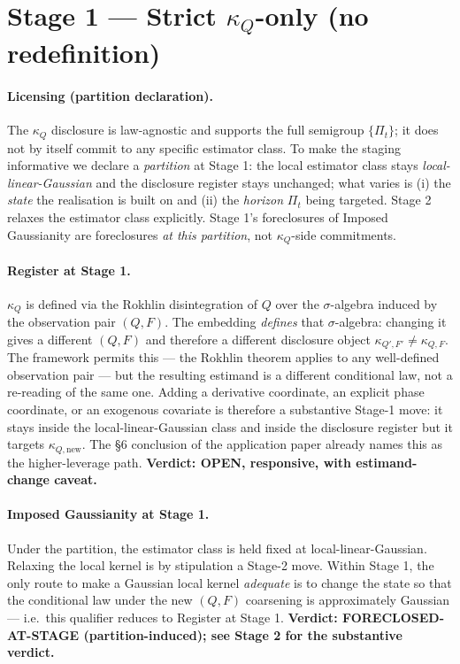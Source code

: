 \documentclass[11pt]{article}
\newcommand{\kQ}{\kappa_{Q}}
\begin{document}
\section{Stage 1 --- Strict \(\kQ\)-only (no redefinition)}
\label{sec:stage1}

\paragraph{Licensing (partition declaration).} The \(\kQ\)
disclosure is law-agnostic and supports the full semigroup
\(\{\Pi_t\}\); it does not by itself commit to any specific
estimator class. To make the staging informative we declare a
\emph{partition} at Stage 1: the local estimator class stays
\emph{local-linear-Gaussian} and the disclosure register stays
unchanged; what varies is (i) the \emph{state} the realisation is
built on and (ii) the \emph{horizon} \(\Pi_t\) being targeted.
Stage 2 relaxes the estimator class explicitly. Stage 1's
foreclosures of Imposed Gaussianity are foreclosures \emph{at this
partition}, not \(\kQ\)-side commitments.

\paragraph{Register at Stage 1.} \(\kQ\) is defined via the Rokhlin
disintegration of \(Q\) over the \(\sigma\)-algebra induced by the
observation pair \((Q, F)\). The embedding \emph{defines} that
\(\sigma\)-algebra: changing it gives a different \((Q, F)\) and
therefore a different disclosure object
\(\kappa_{Q', F'} \neq \kappa_{Q, F}\). The framework permits this ---
the Rokhlin theorem applies to any well-defined observation pair ---
but the resulting estimand is a different conditional law, not a
re-reading of the same one. Adding a derivative coordinate, an
explicit phase coordinate, or an exogenous covariate is therefore a
substantive Stage-1 move: it stays inside the local-linear-Gaussian
class and inside the disclosure register but it targets
\(\kappa_{Q,\mathrm{new}}\). The \S6 conclusion of the application
paper already names this as the higher-leverage path.
\textbf{Verdict: OPEN, responsive, with estimand-change caveat.}

\paragraph{Imposed Gaussianity at Stage 1.} Under the partition, the
estimator class is held fixed at local-linear-Gaussian. Relaxing the
local kernel is by stipulation a Stage-2 move. Within Stage 1, the
only route to make a Gaussian local kernel \emph{adequate} is to
change the state so that the conditional law under the new
\((Q, F)\) coarsening is approximately Gaussian --- i.e.\ this
qualifier reduces to Register at Stage 1. \textbf{Verdict:
FORECLOSED-AT-STAGE (partition-induced); see Stage 2 for the
substantive verdict.}
\end{document}
